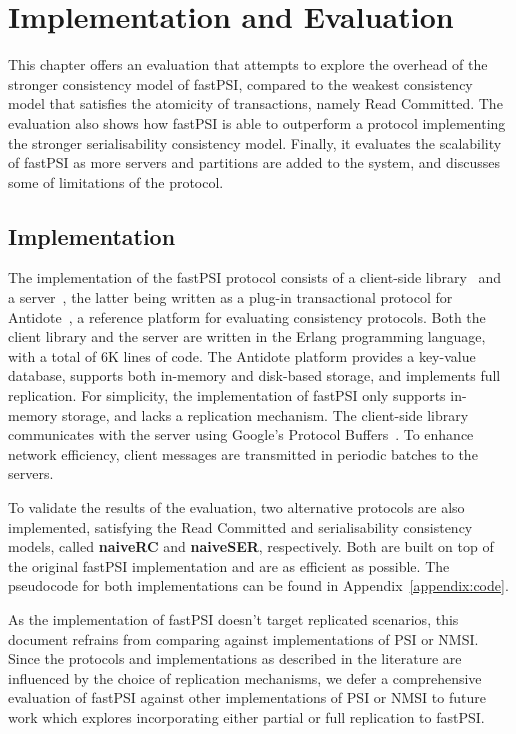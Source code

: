\cleardoublepage
\chapter{Implementation and Evaluation}
\label{chapter:evaluation}

This chapter offers an evaluation that attempts to explore the overhead of the stronger consistency model of fastPSI, compared to the weakest consistency model that satisfies the atomicity of transactions, namely Read Committed. The evaluation also shows how fastPSI is able to outperform a protocol implementing the stronger serialisability consistency model. Finally, it evaluates the scalability of fastPSI as more servers and partitions are added to the system, and discusses some of limitations of the protocol.

\section{Implementation}

The implementation of the fastPSI protocol consists of a client-side library~\citep{fastPSIclient} and a server~\citep{pvc-server}, the latter being written as a plug-in transactional protocol for Antidote~\citep{antidote-db}, a reference platform for evaluating consistency protocols. Both the client library and the server are written in the Erlang programming language, with a total of 6K lines of code. The Antidote platform provides a key-value database, supports both in-memory and disk-based storage, and implements full replication. For simplicity, the implementation of fastPSI only supports in-memory storage, and lacks a replication mechanism. The client-side library communicates with the server using Google's Protocol Buffers~\citep{protobuf}. To enhance network efficiency, client messages are transmitted in periodic batches to the servers.

To validate the results of the evaluation, two alternative protocols are also implemented, satisfying the Read Committed and serialisability consistency models, called \textbf{naiveRC} and \textbf{naiveSER}, respectively. Both are built on top of the original fastPSI implementation and are as efficient as possible. The pseudocode for both implementations can be found in Appendix~\ref{appendix:code}.

As the implementation of fastPSI doesn't target replicated scenarios, this document refrains from comparing against implementations of PSI or NMSI. Since the protocols and implementations as described in the literature are influenced by the choice of replication mechanisms, we defer a comprehensive evaluation of fastPSI against other implementations of PSI or NMSI to future work which explores incorporating either partial or full replication to fastPSI.

